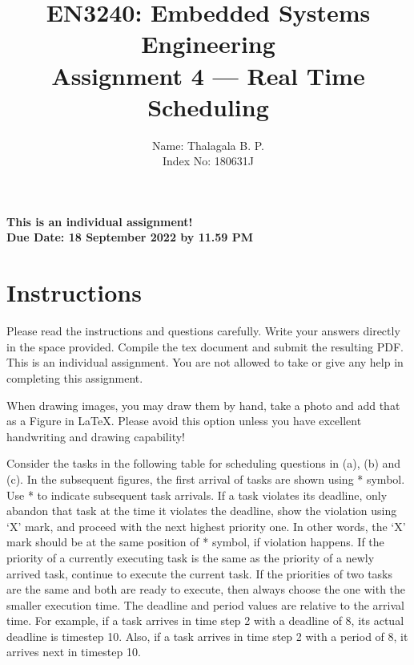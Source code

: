 \documentclass[11pt,letterpaper]{article}
\begin{document}
	
	\title{EN3240: Embedded Systems Engineering \\Assignment 4 --- Real Time Scheduling}
	
	\author{Name: Thalagala B. P. \\ Index No: 180631J}
	
	\maketitle
	
	\begin{center}
		\color{red}\bf This is an individual assignment! \\ Due Date: 18 September 2022 by 11.59 PM
	\end{center}
	
	\section*{Instructions}
	
	Please read the instructions and questions carefully. Write your answers directly in the space provided. Compile the tex document and submit the resulting PDF. This is an individual assignment. You are not allowed to take or give any help in completing this assignment.
	
	When drawing images, you may draw them by hand, take a photo and add that as a Figure in LaTeX. Please avoid this option unless you have excellent handwriting and drawing capability!
	
	\newpage
	Consider the tasks in the following table for scheduling questions in (a), (b) and (c). In the subsequent figures, the first arrival of tasks are shown using * symbol. Use * to indicate subsequent task arrivals. If a task violates its deadline, only abandon that task at the time it violates the deadline, show the violation using `X' mark, and proceed with the next highest priority one. In other words, the `X' mark should be at the same position of * symbol, if violation happens. If the priority of a currently executing task is the same as the priority of a newly arrived task, continue to execute the current task. If the priorities of two tasks are the same and both are ready to execute, then always choose the one with the smaller execution time. The deadline and period values are relative to the arrival time. For example, if a task arrives in time step 2 with a deadline of 8, its actual deadline is timestep 10. Also, if a task arrives in time step 2 with a period of 8, it arrives next in timestep 10.
	
\end{document}
